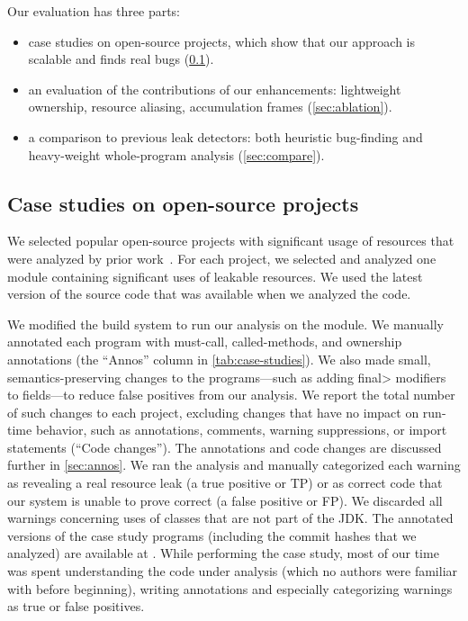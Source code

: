 Our evaluation has three parts:
\begin{itemize}
\item case studies on open-source projects, which show that our approach
  is scalable and finds real bugs (\cref{sec:case-studies}).
\item an evaluation of the contributions of our enhancements:
  lightweight ownership, %
  resource aliasing, %
  accumulation frames %
  (\cref{sec:ablation}).
\item a comparison to previous leak detectors:  both heuristic bug-finding
  and heavy-weight whole-program
  analysis (\cref{sec:compare}).
\end{itemize}

\subsection{Case studies on open-source projects}
\label{sec:case-studies}

We selected  popular open-source projects with significant
usage of resources that were analyzed by prior work~\cite{zuo2019grapple}.
For each project, we selected and analyzed one module
containing significant uses of leakable resources. We used
the latest version of the source code that was available
when we analyzed the code.

We modified the
build system to run our analysis on the module. We manually
annotated each program with must-call, called-methods, and ownership
annotations (the ``Annos'' column in \cref{tab:case-studies}).
We also
made small, semantics-preserving changes to the programs---such as adding
\<final> modifiers to fields---to reduce
false positives from our analysis. We report the total number
of such changes to each project, excluding changes
that have no impact on run-time behavior, such as annotations, comments,
warning suppressions, or import statements (``Code changes'').
The annotations and code changes are discussed further in \cref{sec:annos}.
We ran the analysis and manually categorized each warning as revealing a
real resource leak (a true positive or TP) or as correct code that our
system is unable to prove correct (a false positive or FP\@).
We discarded all warnings concerning uses of classes that are not
part of the JDK.
The
annotated versions of the case study programs (including
the commit hashes that we analyzed) are available at
.
While performing the case study, most of our time was spent
understanding the code under analysis (which no authors were familiar
with before beginning), writing annotations and especially categorizing
warnings as true or false positives.

